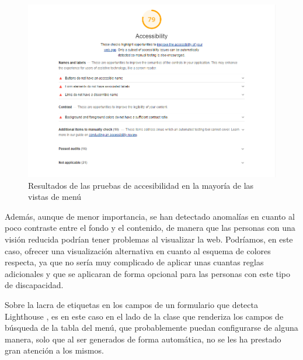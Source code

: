 \begin{figure}
	\centering
	\includegraphics[width=\linewidth]{img/test_accesibilidad}
	\caption[Resultados de las pruebas de accesibilidad]{Resultados de las pruebas de accesibilidad en la mayoría de las vistas de menú}
	\label{fig:testaccesibilidad}
\end{figure}

Además, aunque de menor importancia, se han detectado anomalías en cuanto al poco contraste entre el fondo y el contenido, de manera que las personas con una visión reducida podrían tener problemas al visualizar la web. Podríamos, en este caso, ofrecer una visualización alternativa en cuanto al esquema de colores respecta, ya que no sería muy complicado de aplicar unas cuantas reglas adicionales y que se aplicaran de forma opcional para las personas con este tipo de discapacidad.

Sobre la lacra de etiquetas en los campos de un formulario que detecta Lighthouse \cite{lighthouse}, es en este caso en el lado de la clase que renderiza los campos de búsqueda de la tabla del menú, que probablemente puedan configurarse de alguna manera, solo que al ser generados de forma automática, no se les ha prestado gran atención a los mismos.


